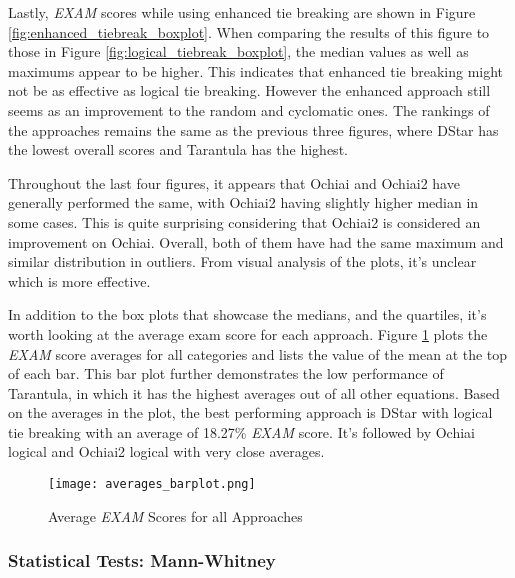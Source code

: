 Lastly, \emph{EXAM} scores while using enhanced tie breaking are shown in Figure
\ref{fig:enhanced_tiebreak_boxplot}. When comparing the results of this figure
to those in Figure \ref{fig:logical_tiebreak_boxplot}, the median values as well
as maximums appear to be higher. This indicates that enhanced tie breaking might
not be as effective as logical tie breaking. However the enhanced approach still
seems as an improvement to the random and cyclomatic ones. The rankings of the
approaches remains the same as the previous three figures, where DStar has the
lowest overall scores and Tarantula has the highest.

Throughout the last four figures, it appears that Ochiai and Ochiai2 have
generally performed the same, with Ochiai2 having slightly higher median in some
cases. This is quite surprising considering that Ochiai2 is considered an
improvement on Ochiai. Overall, both of them have had the same maximum and
similar distribution in outliers. From visual analysis of the plots, it's
unclear which is more effective.

In addition to the box plots that showcase the medians, and the quartiles, it's
worth looking at the average exam score for each approach. Figure
\ref{fig:averages_barplot} plots the \emph{EXAM} score averages for all
categories and lists the value of the mean at the top of each bar. This bar plot further demonstrates the low performance of Tarantula,
in which it has the highest averages out of all other equations. Based on the
averages in the plot, the best performing approach is DStar with logical tie
breaking with an average of 18.27\% \emph{EXAM} score. It's followed by Ochiai
logical and Ochiai2 logical with very close averages.

\begin{figure}[!htb]
	\begin{center}
		\texttt{[image: averages\_barplot.png]}
        \caption{\label{fig:averages_barplot} Average \emph{EXAM} Scores for all
        Approaches}
	\end{center}
\end{figure}

\subsubsection{Statistical Tests: Mann-Whitney}
\label{subsubsec:statistical_test_mann_whitney}


